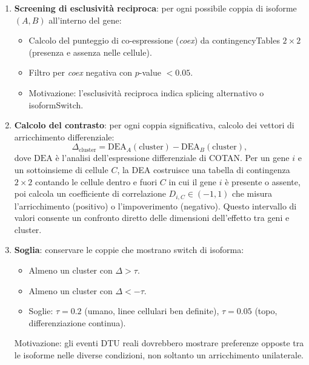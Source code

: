 \begin{enumerate}
    \item \textbf{Screening di esclusività reciproca}: per ogni possibile coppia di isoforme $(A, B)$ all'interno del gene:
    \begin{itemize}
        \item Calcolo del punteggio di co-espressione (\textit{coex}) da \glspl{contingencyTable} $2 \times 2$ (presenza e assenza nelle cellule).
        \item Filtro per \textit{coex} negativa con $p$-value $< 0.05$.
        \item Motivazione: l'esclusività reciproca indica \gls{splicing} alternativo o \gls{isoformSwitch}.
    \end{itemize}
    
    \item \textbf{Calcolo del contrasto}: per ogni coppia significativa, calcolo dei vettori di arricchimento differenziale:
    \begin{equation}
        \Delta_{\text{cluster}} = \text{DEA}_A(\text{cluster}) - \text{DEA}_B(\text{cluster}),
    \end{equation}
    dove $\text{DEA}$ è l'analisi dell'espressione differenziale di COTAN. Per un gene $i$ e un sottoinsieme di cellule $C$, la DEA costruisce una tabella di contingenza $2 \times 2$ contando le cellule dentro e fuori $C$ in cui il gene $i$ è presente o assente, poi calcola un coefficiente di correlazione $D_{i,C} \in (-1, 1)$ che misura l'arricchimento (positivo) o l'impoverimento (negativo). Questo intervallo di valori consente un confronto diretto delle dimensioni dell'effetto tra geni e cluster.
    
    \item \textbf{Soglia}: conservare le coppie che mostrano switch di isoforma:
    \begin{itemize}
        \item Almeno un cluster con $\Delta > \tau$.
        \item Almeno un cluster con $\Delta < -\tau$.
        \item Soglie: $\tau = 0.2$ (umano, linee cellulari ben definite), $\tau = 0.05$ (topo, differenziazione continua).
    \end{itemize}
    Motivazione: gli eventi DTU reali dovrebbero mostrare preferenze opposte tra le isoforme nelle diverse condizioni, non soltanto un arricchimento unilaterale.
\end{enumerate}

